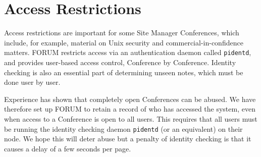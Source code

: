 \section{\label{sec:access}Access Restrictions}

Access restrictions are important for some Site Manager Conferences,
which include, for example, material on Unix security and
commercial-in-confidence matters.  FORUM restricts access via an
authentication daemon called {\tt pidentd}, and provides user-based
access control, Conference by Conference.  Identity checking is also an
essential part of determining unseen notes, which must be done user by
user.

Experience has shown that completely open Conferences can be abused.
We have therefore set up FORUM to retain a record of who has accessed
the system, even when access to a Conference is open to all users.
This requires that all users must be running the identity checking
daemon {\tt pidentd} (or an equivalent) on their node.  We hope this
will deter abuse but  a penalty of identity checking is that it causes
a delay of a few seconds per page.


